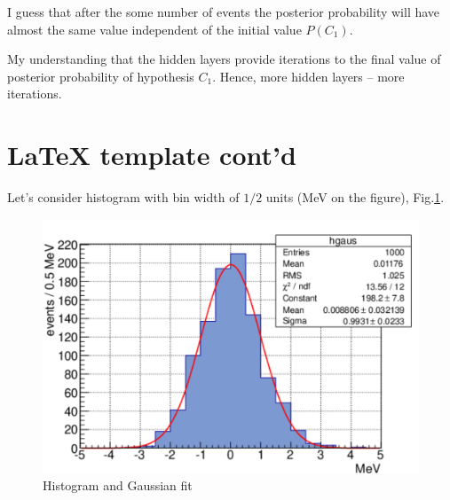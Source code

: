 \documentclass[english]{article}
\makeatletter
\def\ScaleIfNeeded{%
\ifdim\Gin@nat@width>\linewidth
\linewidth
\else
\Gin@nat@width
\fi
}
\makeatother
\begin{document}
I guess that after the some number of events the posterior probability will have almost the same value independent of the initial value $P(C_1)$.

My understanding that the hidden layers provide iterations to the final value of posterior probability of hypothesis $C_1$.
Hence, more hidden layers -- more iterations.

\newpage

\section{LaTeX template cont'd}

Let's consider histogram with bin width of $1/2$ units (MeV on the figure), Fig.\ref{fig:hgaus}.

\begin{figure}[h]
\centering
\begin{minipage}[t]{1.0 \linewidth}
\includegraphics[width=\ScaleIfNeeded]{latex_template_pic}
\caption{Histogram and Gaussian fit}
\label{fig:hgaus}
\end{minipage}
\end{figure}
\end{document}

